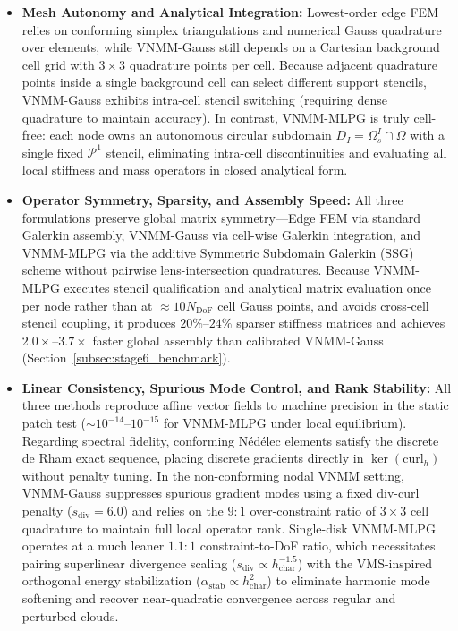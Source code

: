 \documentclass[VANCOUVER,Times1COL]{WileyNJD-v5}
\begin{document}
\begin{itemize}
    \item \textbf{Mesh Autonomy and Analytical Integration:} Lowest-order edge FEM relies on conforming simplex triangulations and numerical Gauss quadrature over elements, while VNMM-Gauss still depends on a Cartesian background cell grid with $3 \times 3$ quadrature points per cell. Because adjacent quadrature points inside a single background cell can select different support stencils, VNMM-Gauss exhibits intra-cell stencil switching (requiring dense quadrature to maintain accuracy). In contrast, VNMM-MLPG is truly cell-free: each node owns an autonomous circular subdomain $D_I = \Omega_s^I \cap \Omega$ with a single fixed $\mathcal{P}^1$ stencil, eliminating intra-cell discontinuities and evaluating all local stiffness and mass operators in closed analytical form.
    \item \textbf{Operator Symmetry, Sparsity, and Assembly Speed:} All three formulations preserve global matrix symmetry---Edge FEM via standard Galerkin assembly, VNMM-Gauss via cell-wise Galerkin integration, and VNMM-MLPG via the additive Symmetric Subdomain Galerkin (SSG) scheme without pairwise lens-intersection quadratures. Because VNMM-MLPG executes stencil qualification and analytical matrix evaluation once per node rather than at $\approx 10 N_{\mathrm{DoF}}$ cell Gauss points, and avoids cross-cell stencil coupling, it produces $20\%\text{--}24\%$ sparser stiffness matrices and achieves $2.0\times\text{--}3.7\times$ faster global assembly than calibrated VNMM-Gauss (Section~\ref{subsec:stage6_benchmark}).
    \item \textbf{Linear Consistency, Spurious Mode Control, and Rank Stability:} All three methods reproduce affine vector fields to machine precision in the static patch test ($\sim 10^{-14}\text{--}10^{-15}$ for VNMM-MLPG under local equilibrium). Regarding spectral fidelity, conforming N\'{e}d\'{e}lec elements satisfy the discrete de Rham exact sequence, placing discrete gradients directly in $\ker(\mathrm{curl}_h)$ without penalty tuning. In the non-conforming nodal VNMM setting, VNMM-Gauss suppresses spurious gradient modes using a fixed div-curl penalty ($s_{\mathrm{div}} = 6.0$) and relies on the $9:1$ over-constraint ratio of $3 \times 3$ cell quadrature to maintain full local operator rank. Single-disk VNMM-MLPG operates at a much leaner $1.1:1$ constraint-to-DoF ratio, which necessitates pairing superlinear divergence scaling ($s_{\mathrm{div}} \propto h_{\mathrm{char}}^{-1.5}$) with the VMS-inspired orthogonal energy stabilization ($\alpha_{\mathrm{stab}} \propto h_{\mathrm{char}}^2$) to eliminate harmonic mode softening and recover near-quadratic convergence across regular and perturbed clouds.
\end{itemize}
\end{document}
